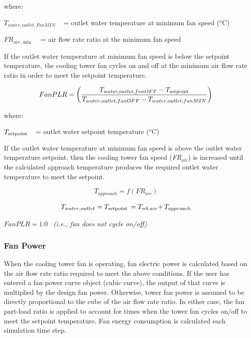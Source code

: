 where:

\({T_{water,outlet,FanMIN}}\) ~ = outlet water temperature at minimum fan speed (\(^{o}\)C)

\(F{R_{air,\min }}\) ~ = air flow rate ratio at the minimum fan speed

If the outlet water temperature at minimum fan speed is below the setpoint temperature, the cooling tower fan cycles on and off at the minimum air flow rate ratio in order to meet the setpoint temperature.

\begin{equation}
FanPLR = \left( {\frac{{{T_{water,outlet,fanOFF}} - {T_{{\rm{setpoint}}}}}}{{{T_{water,outlet,fanOFF}} - {T_{water,outlet,fanMIN}}}}} \right)
\end{equation}

where:

\({T_{{\rm{setpoint}}}}\) ~ = outlet water setpoint temperature (\(^{o}\)C)

If the outlet water temperature at minimum fan speed is above the outlet water temperature setpoint, then the cooling tower fan speed (\emph{FR\(_{air}\)}) is increased until the calculated approach temperature produces the required outlet water temperature to meet the setpoint.

\begin{equation}
{T_{approach}} = f\left( {F{R_{air}}} \right)
\end{equation}

\begin{equation}
{T_{water,outlet}} = {T_{{\rm{setpoint}}}}\, = {T_{wb,air}}{\rm{ + }}\,{T_{approach}}
\end{equation}

\(FanPLR = 1.0\) ~\emph{(i.e., fan does not cycle on/off)}

\subsubsection{Fan Power}\label{fan-power}

When the cooling tower fan is operating, fan electric power is calculated based on the air flow rate ratio required to meet the above conditions. If the user has entered a fan power curve object (cubic curve), the output of that curve is multiplied by the design fan power. Otherwise, tower fan power is assumed to be directly proportional to the cube of the air flow rate ratio. In either case, the fan part-load ratio is applied to account for times when the tower fan cycles on/off to meet the setpoint temperature. Fan energy consumption is calculated each simulation time step.

